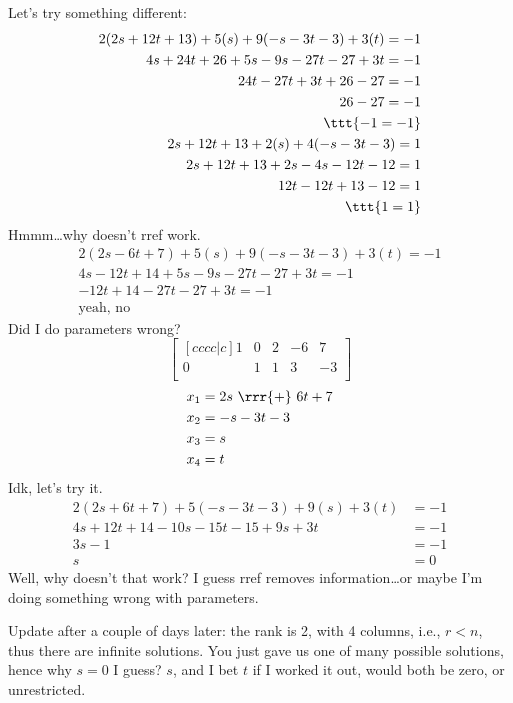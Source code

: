 \documentclass[basic]{inVerba-notes}
\begin{document}
\begin{enumerate}
Let's try something different:
\begin{align*}
  2(2s + 12t + 13) + 5(s) + 9(-s -3t -3) + 3(t) = -1 \\
  4s + 24t + 26 + 5s - 9s - 27t - 27 + 3t = -1 \\
  24t - 27t+ 3t + 26 -27  = - 1 \\ 
  26 - 27 = -1 \\
  \ttt{-1 = -1} \\
  2s + 12t + 13 + 2(s) + 4(-s -3t - 3) = 1 \\
  2s + 12t + 13 + 2s - 4s -12t - 12 = 1 \\
  12t - 12t + 13 - 12 = 1 \\
  \ttt{1 = 1}
\end{align*}
Hmmm\dots why doesn't rref work.
\begin{align*}
  2(2s - 6t + 7) + 5(s) + 9 (-s -3t -3) + 3(t) = - 1 \\
  4s - 12t + 14 + 5s - 9s - 27t - 27 + 3t = - 1 \\
  -12t + 14 - 27t -27 + 3t = -1 \\
  \text{yeah, no}  
\end{align*}
Did I do parameters wrong?
\[%
\begin{bmatrix}[cccc|c]
  1 & 0 & 2 & -6 & 7 \\
  0 & 1 & 1 & 3 & -3 \\
\end{bmatrix}
\]%
\begin{align*}
  x_1 &= 2s~\rrr{+}~6t + 7 \\
  x_2 &= -s -3t - 3 \\
  x_3 &= s \\
  x_4 &= t
\end{align*}
Idk, let's try it.
\begin{align*}
  2(2s + 6t + 7) + 5(-s -3t -3) + 9(s) + 3(t) &= -1 \\
  4s + 12t + 14 -10s -15t - 15 + 9s + 3t &= -1 \\
  3s - 1 &= -1 \\ 
  s &= 0
\end{align*}
Well, why doesn't that work? I guess rref removes information\dots or maybe I'm doing something wrong with parameters.

Update after a couple of days later: the rank is 2, with 4 columns, i.e., \(r < n\), thus there are infinite solutions. You just gave us one of many possible solutions, hence why \(s=0\) I guess? \(s\), and I bet \(t\) if I worked it out, would both be zero, or unrestricted.
\end{enumerate}
\end{document}
